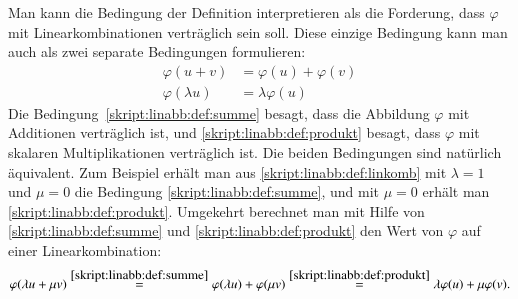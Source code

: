Man kann die Bedingung der Definition interpretieren als die Forderung,
dass $\varphi$ mit Linearkombinationen verträglich sein soll.
Diese einzige Bedingung kann man auch als zwei separate Bedingungen
formulieren:
\begin{align}
\varphi(u+v)&=\varphi(u)+\varphi(v)
\label{skript:linabb:def:summe}
\\
\varphi(\lambda u)&=\lambda \varphi(u)
\label{skript:linabb:def:produkt}
\end{align}
Die Bedingung~\eqref{skript:linabb:def:summe} besagt, dass die Abbildung
$\varphi$ mit Additionen verträglich ist, und 
\eqref{skript:linabb:def:produkt} besagt, dass $\varphi$ mit skalaren
Multiplikationen verträglich ist.
Die beiden Bedingungen sind natürlich äquivalent.
Zum Beispiel erhält man aus \eqref{skript:linabb:def:linkomb}
mit $\lambda=1$ und $\mu=0$ die Bedingung \eqref{skript:linabb:def:summe},
und mit $\mu =0$ erhält man
\eqref{skript:linabb:def:produkt}.
Umgekehrt berechnet man mit Hilfe von
\eqref{skript:linabb:def:summe}
und
\eqref{skript:linabb:def:produkt}
den Wert von $\varphi$ auf einer Linearkombination:
\[
\varphi(\lambda u + \mu v)
\overset{\eqref{skript:linabb:def:summe}}{=}
\varphi(\lambda u) + \varphi(\mu v)
\overset{\eqref{skript:linabb:def:produkt}}{=}
\lambda \varphi( u) + \mu \varphi( v).
\]







